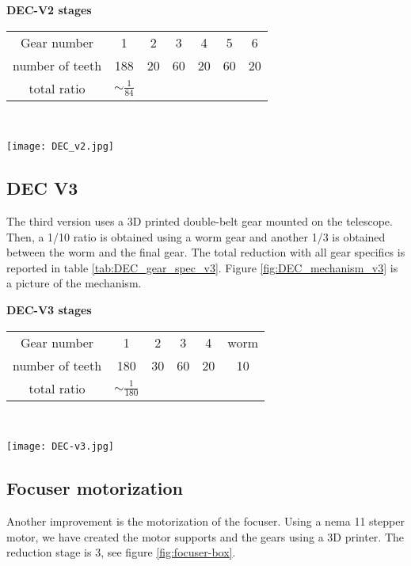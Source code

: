 \begin{minipage}
    {0.5\textwidth}
    \centering
    \textbf{DEC-V2 stages}\\
    \begin{tabular}{ccccccc}
        \hline
        Gear number & 1 & 2 & 3 & 4 & 5 & 6\\
        number of teeth & 188 & 20 & 60 & 20 & 60 & 20\\
        \hline
        total ratio & \(\sim \frac{1}{84}\) &&&
    \end{tabular}
    \label{tab:DEC_gear_spec_v2}
\end{minipage}
\\
\begin{minipage}
    {0.5\textwidth}
    \centering
    \texttt{[image: DEC\_v2.jpg]}
    \label{fig:DEC_mechanism_v2}
\end{minipage}

\subsection{DEC V3}
The third version uses a 3D printed double-belt gear mounted on the telescope.
Then, a 1/10 ratio is obtained using a worm gear and another 1/3 is obtained between the worm and the final gear.
The total reduction with all gear specifics is reported in table \ref{tab:DEC_gear_spec_v3}.
Figure \ref{fig:DEC_mechanism_v3} is a picture of the mechanism.

\begin{minipage}
    {0.5\textwidth}
    \textbf{DEC-V3 stages}\\
    \centering
    \begin{tabular}{cccccc}
        \hline
        Gear number & 1 & 2 & 3 & 4 & worm\\
        number of teeth & 180 & 30 & 60 & 20 & 10\\
        \hline
        total ratio & \(\sim \frac{1}{180}\) &&&
    \end{tabular}
    \label{tab:DEC_gear_spec_v3}
\end{minipage}
\\
\begin{minipage}
    {0.5\textwidth}
    \centering
    \texttt{[image: DEC-v3.jpg]}
    \label{fig:DEC_mechanism_v3}
\end{minipage}

\subsection{Focuser motorization}
Another improvement is the motorization of the focuser.
Using a nema 11 stepper motor, we have created the motor supports and the gears using a 3D printer.
The reduction stage is 3, see figure \ref{fig:focuser-box}.